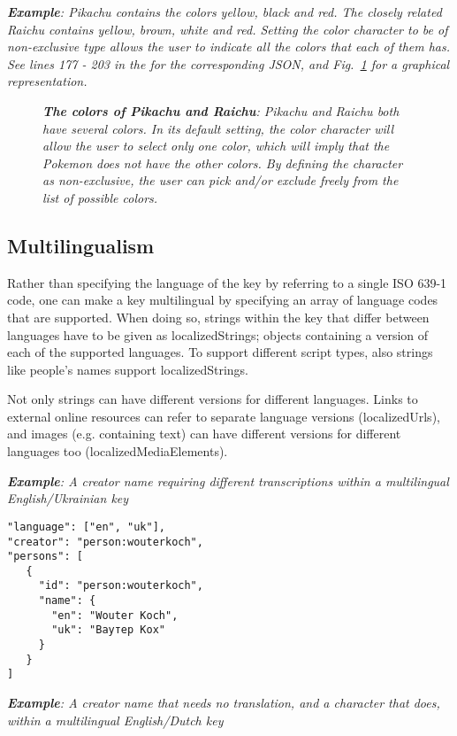 \documentclass[10pt,letterpaper]{article}
\begin{document}
\textit{\textbf{Example}: Pikachu contains the colors yellow, black and red. The closely related Raichu contains yellow, brown, white and red. Setting the color character to be of non-exclusive type allows the user to indicate all the colors that each of them has. See lines 177 - 203 in the  for the corresponding JSON, and Fig.~\ref{fig4} for a graphical representation.}


\begin{figure}[!h]
  \caption{\textit{\textbf{The colors of Pikachu and Raichu}:
Pikachu and Raichu both have several colors. In its default setting, the color character will allow the user to select only one color, which will imply that the Pokemon does not have the other colors. By defining the character as non-exclusive, the user can pick and/or exclude freely from the list of possible colors.
}}
 \label{fig4}
\end{figure}

\subsection*{
Multilingualism
}
Rather than specifying the language of the key by referring to a single ISO 639-1 code, one can make a key multilingual by specifying an array of language codes that are supported. When doing so, strings within the key that differ between languages have to be given as localizedStrings; objects containing a version of each of the supported languages. To support different script types, also strings like people's names support localizedStrings.

Not only strings can have different versions for different languages. Links to external online resources can refer to separate language versions (localizedUrls), and images (e.g. containing text) can have different versions for different languages too (localizedMediaElements).

\textit{\textbf{Example}: A creator name requiring different transcriptions within a multilingual English/Ukrainian key}
\begin{verbatim}
"language": ["en", "uk"],
"creator": "person:wouterkoch",
"persons": [
   {
     "id": "person:wouterkoch",
     "name": {
       "en": "Wouter Koch",
       "uk": "Ваутер Кох"
     }
   }
]

\end{verbatim}

\textit{\textbf{Example}: A creator name that needs no translation, and a character that does, within a multilingual English/Dutch key}
\end{document}
